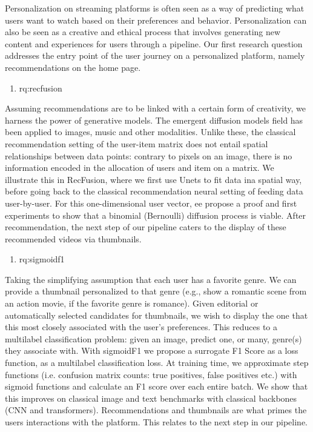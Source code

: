 Personalization on streaming platforms is often seen as a way of predicting what users want to watch based on their preferences and behavior. Personalization can also be seen as a creative and ethical process that involves generating new content and experiences for users through a pipeline. Our first research question addresses the entry point of the user journey on a personalized platform, namely recommendations on the home page.
%
\begin{enumerate}[label=\textbf{RQ\arabic*},ref={RQ\arabic*},resume,leftmargin=*]
	\item \acl{rq:recfusion}\label{rq:recfusion}
\end{enumerate}
%
Assuming recommendations are to be linked with a certain form of creativity, we harness the power of generative models. The emergent diffusion models field has been applied to images, music and other modalities. Unlike these, the classical recommendation setting of the user-item matrix does not entail spatial relationships between data points: contrary to pixels on an image, there is no information encoded in the allocation of users and item on a matrix. We illustrate this in RecFusion, where we first use Unets to fit data ina spatial way, before going back to the classical recommendation neural setting of feeding data user-by-user. For this one-dimensional user vector, ee propose a proof and first experiments to show that a binomial (Bernoulli) diffusion process is viable. After recommendation, the next step of our pipeline caters to the display of these recommended videos via thumbnails.
%
%
\begin{enumerate}[label=\textbf{RQ\arabic*},ref={RQ\arabic*},resume,leftmargin=*]
	\item \acl{rq:sigmoidf1}\label{rq:sigmoidf1}
\end{enumerate}
%
Taking the simplifying assumption that each user has a favorite genre. We can provide a thumbnail personalized to that genre (e.g., show a romantic scene from an action movie, if the favorite genre is romance). Given editorial or automatically selected candidates for thumbnails, we wish to display the one that this most closely associated with the user's preferences. This reduces to a multilabel classification problem: given an image, predict one, or many, genre(s) they associate with. With sigmoidF1 we propose a surrogate F1 Score as a loss function, as a multilabel classification loss. At training time, we approximate step functions (i.e. confusion matrix counts: true positives, false positives etc.) with sigmoid functions and calculate an F1 score over each entire batch. We show that this improves on classical image and text benchmarks with classical backbones (CNN and transformers). Recommendations and thumbnails are what primes the users interactions with the platform. This relates to the next step in our pipeline.
